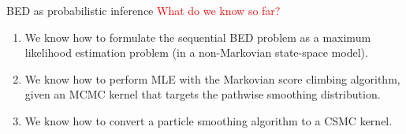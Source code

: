 \documentclass[10pt, aspectratio=1610]{beamer}
\begin{document}
    \begin{frame}{BED as probabilistic inference}
      \textcolor{red}{\large What do we know so far?}\vspace{0.1cm}
      \begin{enumerate}
        \item<2-> We know how to formulate the sequential BED problem as a maximum likelihood estimation problem (in a non-Markovian state-space model).
        \item<3-> We know how to perform MLE with the Markovian score climbing algorithm, given an MCMC kernel that targets the pathwise smoothing distribution.
        \item<4-> We know how to convert a particle smoothing algorithm to a CSMC kernel.
      \end{enumerate}

      \vspace{0.3cm}
    \end{frame}
\end{document}

